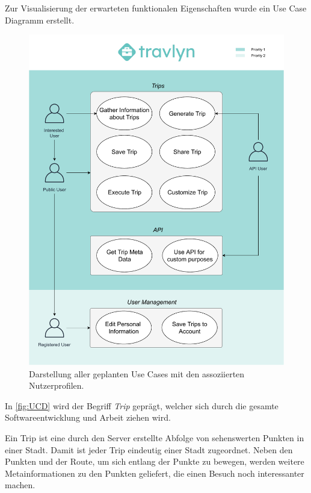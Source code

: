 Zur Visualisierung der erwarteten funktionalen Eigenschaften wurde ein Use Case Diagramm erstellt.
\begin{figure}[H]
	\centering
	\includegraphics[width=1\textwidth]{../ucd/UCD.pdf}
	\caption{Darstellung aller geplanten Use Cases mit den assoziierten Nutzerprofilen.}
	\label{fig:UCD}
\end{figure}

\newpage

In \autoref{fig:UCD} wird der Begriff \textit{Trip} geprägt, welcher sich durch die gesamte Softwareentwicklung und Arbeit ziehen wird.

\begin{defStrich}[Trip]
	Ein Trip ist eine durch den Server erstellte Abfolge von sehenswerten Punkten in einer Stadt. Damit ist jeder Trip eindeutig einer Stadt zugeordnet. Neben den Punkten und der Route, um sich entlang der Punkte zu bewegen, werden weitere Metainformationen zu den Punkten geliefert, die einen Besuch noch interessanter machen.
\end{defStrich} 

